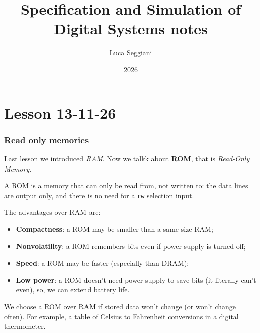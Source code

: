 \documentclass[a4paper,11pt]{article}
\title{Specification and Simulation of Digital Systems notes}
\author{Luca Seggiani}
\date{2026}
\begin{document}
\section{Lesson 13-11-26}

\thispagestyle{empty}
\pagestyle{fancy}

\subsubsection{Read only memories}

Last lesson we introduced \textit{RAM}. Now we talkk about \textbf{ROM}, that is \textit{Read-Only Memory}.

A ROM is a memory that can only be read from, not written to: the data lines are output only, and there is no need for a \texttt{rw} selection input.

The advantages over RAM are:
\begin{itemize}
	\item \textbf{Compactness}: a ROM may be smaller than a same size RAM;
	\item \textbf{Nonvolatility}: a ROM remembers bits even if power supply is turned off;
	\item \textbf{Speed}: a ROM may be faster (especially than DRAM);
	\item \textbf{Low power}: a ROM doesn’t need power supply to save bits (it literally can't even), so, we can extend battery life.
\end{itemize}
We choose a ROM over RAM if stored data won’t change (or won’t change often).
For example, a table of Celsius to Fahrenheit conversions in a digital thermometer.
\end{document}
